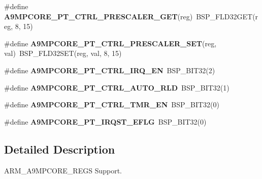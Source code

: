 \begin{DoxyCompactItemize}
\item 
\mbox{\label{arm-a9mpcore-regs_8h_a2a560f5a274603a400d6059ee1405d54}} 
\#define {\bfseries A9\+M\+P\+C\+O\+R\+E\+\_\+\+P\+T\+\_\+\+C\+T\+R\+L\+\_\+\+P\+R\+E\+S\+C\+A\+L\+E\+R\+\_\+\+G\+ET}(reg)~B\+S\+P\+\_\+\+F\+L\+D32\+G\+ET(reg, 8, 15)
\item 
\mbox{\label{arm-a9mpcore-regs_8h_ada4b7c7a231644b858e4a8219fcd7a4b}} 
\#define {\bfseries A9\+M\+P\+C\+O\+R\+E\+\_\+\+P\+T\+\_\+\+C\+T\+R\+L\+\_\+\+P\+R\+E\+S\+C\+A\+L\+E\+R\+\_\+\+S\+ET}(reg,  val)~B\+S\+P\+\_\+\+F\+L\+D32\+S\+ET(reg, val, 8, 15)
\item 
\mbox{\label{arm-a9mpcore-regs_8h_aa0c0a72d17b243814705dea7613bdbab}} 
\#define {\bfseries A9\+M\+P\+C\+O\+R\+E\+\_\+\+P\+T\+\_\+\+C\+T\+R\+L\+\_\+\+I\+R\+Q\+\_\+\+EN}~B\+S\+P\+\_\+\+B\+I\+T32(2)
\item 
\mbox{\label{arm-a9mpcore-regs_8h_adf32ee7a0bf48846cdbeb4851f5850b1}} 
\#define {\bfseries A9\+M\+P\+C\+O\+R\+E\+\_\+\+P\+T\+\_\+\+C\+T\+R\+L\+\_\+\+A\+U\+T\+O\+\_\+\+R\+LD}~B\+S\+P\+\_\+\+B\+I\+T32(1)
\item 
\mbox{\label{arm-a9mpcore-regs_8h_ae8e15dd578a1876bdedc54eca1bfe6e1}} 
\#define {\bfseries A9\+M\+P\+C\+O\+R\+E\+\_\+\+P\+T\+\_\+\+C\+T\+R\+L\+\_\+\+T\+M\+R\+\_\+\+EN}~B\+S\+P\+\_\+\+B\+I\+T32(0)
\item 
\mbox{\label{arm-a9mpcore-regs_8h_a86b158196d03052ffd6db0aea3447818}} 
\#define {\bfseries A9\+M\+P\+C\+O\+R\+E\+\_\+\+P\+T\+\_\+\+I\+R\+Q\+S\+T\+\_\+\+E\+F\+LG}~B\+S\+P\+\_\+\+B\+I\+T32(0)
\end{DoxyCompactItemize}


\subsection{Detailed Description}
A\+R\+M\+\_\+\+A9\+M\+P\+C\+O\+R\+E\+\_\+\+R\+E\+GS Support. 

